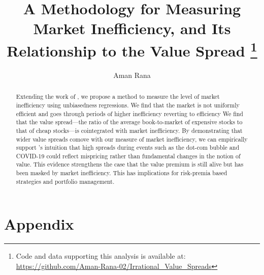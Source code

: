 \documentclass[11pt,a4paper,english]{article}
\date{\displaydate{date}}
\title{A Methodology for Measuring Market Inefficiency, and Its Relationship to the Value Spread 
\thanks{Code and data supporting this analysis is available at: \url{https://github.com/Aman-Rana-02/Irrational_Value_Spreads}}}
\author{%
  Aman Rana\\
}
\begin{document}
  \maketitle

  \begin{abstract}
    \noindent Extending the work of \citet{boguth_2023}, we propose a method to measure the level of market inefficiency using unbiasedness regressions.
    We find that the market is not uniformly efficient and goes through periods of higher inefficiency reverting to efficiency We find that the value spread—the ratio of the average book-to-market of expensive stocks to that of cheap stocks—is cointegrated with market inefficiency. 
    By demonstrating that wider value spreads comove with our measure of market inefficiency, we can empirically support \citet{asness_2024}'s intuition 
    that high spreads during events such as the dot-com bubble and COVID-19 could reflect mispricing rather than fundamental changes in the notion of value. 
    This evidence strengthens the case that the value premium is still alive but has been masked by market inefficiency. 
    This has implications for risk-premia based strategies and portfolio management.
  \end{abstract}

  \newpage
  \tableofcontents

  \newpage
  

  \newpage
  

  
  
  

  \newpage
  

  \newpage
  
  

  \section*{Appendix}
  \renewcommand{\thesection}{\Alph{section}}
  \setcounter{section}{0}
  
\end{document}
